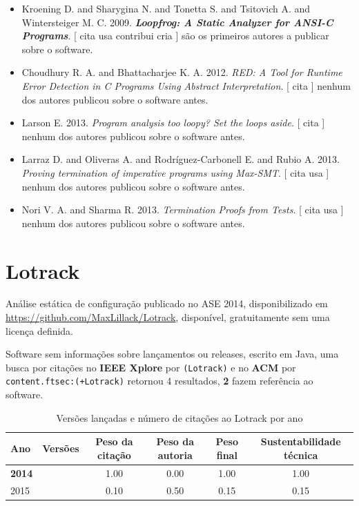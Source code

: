 \begin{itemize}
\item Kroening D. and Sharygina N. and Tonetta S. and Tsitovich A. and Wintersteiger M. C.
      2009.
        \textbf{\textit{ Loopfrog: A Static Analyzer for ANSI-C Programs}}.
      [
          cita
          usa
          contribui
          cria
      ]
são os primeiros autores a publicar sobre o software.
\item Choudhury R. A. and Bhattacharjee K. A.
      2012.
        \textit{ RED: A Tool for Runtime Error Detection in C Programs Using Abstract Interpretation}.
      [
          cita
      ]
nenhum dos autores publicou sobre o software antes.
\item Larson E.
      2013.
        \textit{ Program analysis too loopy? Set the loops aside}.
      [
          cita
      ]
nenhum dos autores publicou sobre o software antes.
\item Larraz D. and Oliveras A. and Rodríguez-Carbonell E. and Rubio A.
      2013.
        \textit{ Proving termination of imperative programs using Max-SMT}.
      [
          cita
          usa
      ]
nenhum dos autores publicou sobre o software antes.
\item Nori V. A. and Sharma R.
      2013.
        \textit{ Termination Proofs from Tests}.
      [
          cita
          usa
      ]
nenhum dos autores publicou sobre o software antes.
\end{itemize}
\section{Lotrack}

Análise estática de configuração
publicado no ASE 2014,
disponibilizado em \url{https://github.com/MaxLillack/Lotrack},
disponível,
gratuitamente
sem uma licença definida.

Software sem informações sobre lançamentos ou releases,
escrito em Java,
uma busca por citações no {\bf IEEE Xplore} por
\texttt{(Lotrack)}
e no {\bf ACM} por
\texttt{content.ftsec:(+Lotrack)}
retornou
4 resultados,
{\bf 2} fazem referência ao software.


\begin{table}[H]
\caption{Versões lançadas e número de citações ao Lotrack por ano}
\centering
\begin{tabular}{| l | c | c | c | c | c |}
  \hline
  Ano & Versões & Peso da citação & Peso da autoria & Peso final & Sustentabilidade técnica \\
  \hline
            {\bf 2014}
          &
          
          &
          1.00
          &
          0.00
          &
          1.00
          &
            {\color{blue} 1.00}
          \\
\hline
            2015
          &
          
          &
          0.10
          &
          0.50
          &
          0.15
          &
            {\color{red} 0.15}
          \\
\hline
\end{tabular}
\end{table}

